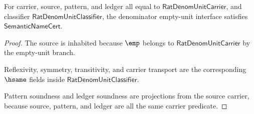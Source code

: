 \begin{theorem}
\label{thm:rat-denom-unit-semantic-namecert}
For carrier, source, pattern, and ledger all equal to
$\mathsf{RatDenomUnitCarrier}$, and classifier
$\mathsf{RatDenomUnitClassifier}$, the denominator empty-unit interface
satisfies $\mathsf{SemanticNameCert}$.
\end{theorem}
\begin{proof}
The source is inhabited because $\emp$ belongs to
$\mathsf{RatDenomUnitCarrier}$ by the empty-unit branch.

Reflexivity, symmetry, transitivity, and carrier transport are the
corresponding $\hsame$ fields inside
$\mathsf{RatDenomUnitClassifier}$.

Pattern soundness and ledger soundness are projections from the source carrier,
because source, pattern, and ledger are all the same carrier predicate.
\end{proof}

